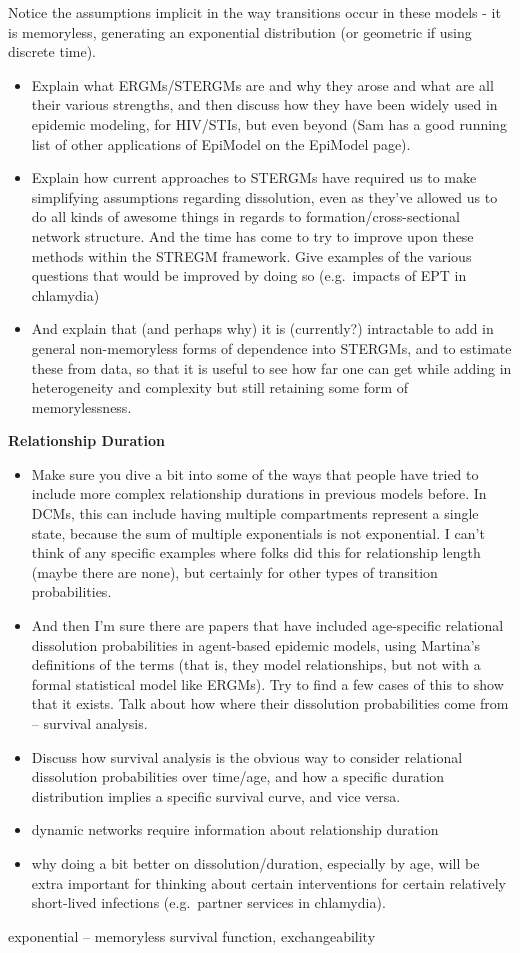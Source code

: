 \documentclass [11pt, proquest] {uwthesis}[2015/03/03]
\providecommand{\tightlist}{%
  \setlength{\itemsep}{0pt}\setlength{\parskip}{0pt}}
\begin{document}
Notice the assumptions implicit in the way transitions occur in these
models - it is memoryless, generating an exponential distribution (or
geometric if using discrete time).
\begin{itemize}
\tightlist
\item
  Explain what ERGMs/STERGMs are and why they arose and what are all
  their various strengths, and then discuss how they have been widely
  used in epidemic modeling, for HIV/STIs, but even beyond (Sam has a
  good running list of other applications of EpiModel on the EpiModel
  page).
\item
  Explain how current approaches to STERGMs have required us to make
  simplifying assumptions regarding dissolution, even as they've allowed
  us to do all kinds of awesome things in regards to
  formation/cross-sectional network structure. And the time has come to
  try to improve upon these methods within the STREGM framework. Give
  examples of the various questions that would be improved by doing so
  (e.g.~impacts of EPT in chlamydia)
\item
  And explain that (and perhaps why) it is (currently?) intractable to
  add in general non-memoryless forms of dependence into STERGMs, and to
  estimate these from data, so that it is useful to see how far one can
  get while adding in heterogeneity and complexity but still retaining
  some form of memorylessness.
\end{itemize}
\textbf{Relationship Duration}
\begin{itemize}
\item
  Make sure you dive a bit into some of the ways that people have tried
  to include more complex relationship durations in previous models
  before. In DCMs, this can include having multiple compartments
  represent a single state, because the sum of multiple exponentials is
  not exponential. I can't think of any specific examples where folks
  did this for relationship length (maybe there are none), but certainly
  for other types of transition probabilities.
\item
  And then I'm sure there are papers that have included age-specific
  relational dissolution probabilities in agent-based epidemic models,
  using Martina's definitions of the terms (that is, they model
  relationships, but not with a formal statistical model like ERGMs).
  Try to find a few cases of this to show that it exists. Talk about how
  where their dissolution probabilities come from -- survival
  analysis.\\
\item
  Discuss how survival analysis is the obvious way to consider
  relational dissolution probabilities over time/age, and how a specific
  duration distribution implies a specific survival curve, and vice
  versa.
\item
  dynamic networks require information about relationship duration
\item
  why doing a bit better on dissolution/duration, especially by age,
  will be extra important for thinking about certain interventions for
  certain relatively short-lived infections (e.g.~partner services in
  chlamydia).
\end{itemize}
exponential -- memoryless survival function, exchangeability
\end{document}
